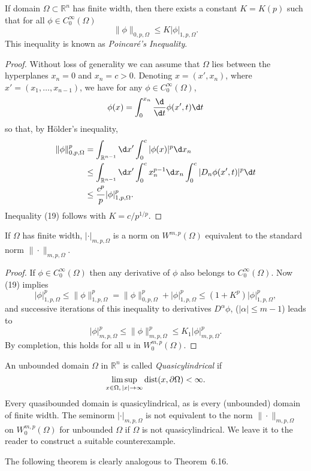 \begin{theorem}
  If domain $\Omega\subset\mathbb{R}^n$ has finite width, then there exists a constant
  $K=K(p)$ such that for all $\phi\in C_0^\infty(\Omega)$
  \begin{equation}\label{eq:6.19}
    \|\phi\|_{0,p,\Omega} \leq K |\phi|_{1,p,\Omega}.
  \end{equation}
  This inequality is known as \emph{Poincar\'e's Inequality}.
\end{theorem}

\begin{proof}
  Without loss of generality we can assume that $\Omega$ lies between the hyperplanes
  $x_n=0$ and $x_n=c>0$. Denoting $x=(x',x_n)$, where $x'=(x_1,\ldots,x_{n-1})$,
  we have for any $\phi\in C_0^\infty(\Omega)$,
  \[ \phi(x) = \int_0^{x_n} \frac{\d}{\d t} \phi(x',t) \d t \]
  so that, by H\"older's inequality,
  \begin{align*}
    \|\phi\|_{0,p,\Omega}^p
    & = \int_{\mathbb{R}^{n-1}} \d x' \int_0^c |\phi(x)|^p \d x_n \\
    & \leq \int_{\mathbb{R}^{n-1}} \d x' \int_0^c x_n^{p-1} \d x_n \int_0^c
        |D_n \phi(x',t)|^p \d t \\
    & \leq \frac{c^p}{p} |\phi|_{1,p,\Omega}^p.
  \end{align*}
  Inequality (19) follows with $K = c/p^{1/p}$.
\end{proof}


\begin{corollary}
  If $\Omega$ has finite width, $|\cdot|_{m,p,\Omega}$ is a norm on $W^{m,p}(\Omega)$
  equivalent to the standard norm $\|\cdot\|_{m,p,\Omega}$.
\end{corollary}

\begin{proof}
  If $\phi\in C_0^\infty(\Omega)$ then any derivative of $\phi$ also belongs to
  $C_0^\infty(\Omega)$. Now (19) implies
  \[ |\phi|_{1,p,\Omega}^p \leq \|\phi\|_{1,p,\Omega}^p
      = \|\phi\|_{0,p,\Omega}^p + |\phi|_{1,p,\Omega}^p
      \leq (1+K^p) |\phi|_{1,p,\Omega}^p, \]
  and successive iterations of this inequality to derivatives $D^\alpha\phi$,
  ($|\alpha|\leq m-1$) leads to
  \[ |\phi|_{m,p,\Omega}^p \leq \|\phi\|_{m,p,\Omega}^p \leq K_1 |\phi|_{m,p,\Omega}^p. \]
  By completion, this holds for all $u$ in $W_0^{m,p}(\Omega)$.
\end{proof}


\begin{para}
  An unbounded domain $\Omega$ in $\mathbb{R}^n$ is called \emph{Quasicylindrical} if
  \[ \limsup_{x\in\Omega,\,|x|\to\infty} \operatorname{dist}(x,\partial\Omega) < \infty. \]
  Every quasibounded domain is quasicylindrical, as is every (unbounded) domain of finite
  width. The seminorm $|\cdot|_{m,p,\Omega}$ is not equivalent to the norm $\|\cdot\|_{m,p,\Omega}$
  on $W_0^{m,p}(\Omega)$ for unbounded $\Omega$ if $\Omega$ is not quasicylindrical.
  We leave it to the reader to construct a suitable counterexample.

  The following theorem is clearly analogous to Theorem~6.16.
\end{para}


